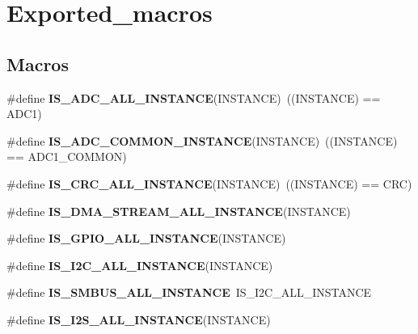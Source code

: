 \hypertarget{group___exported__macros}{}\section{Exported\+\_\+macros}
\label{group___exported__macros}
\subsection*{Macros}
\begin{DoxyCompactItemize}
\item 
\mbox{\label{group___exported__macros_ga2204b62b378bcf08b3b9006c184c7c23}} 
\#define {\bfseries I\+S\+\_\+\+A\+D\+C\+\_\+\+A\+L\+L\+\_\+\+I\+N\+S\+T\+A\+N\+CE}(I\+N\+S\+T\+A\+N\+CE)~((I\+N\+S\+T\+A\+N\+CE) == A\+D\+C1)
\item 
\mbox{\label{group___exported__macros_gad8a5831c786b6b265531b890a194cbe2}} 
\#define {\bfseries I\+S\+\_\+\+A\+D\+C\+\_\+\+C\+O\+M\+M\+O\+N\+\_\+\+I\+N\+S\+T\+A\+N\+CE}(I\+N\+S\+T\+A\+N\+CE)~((I\+N\+S\+T\+A\+N\+CE) == A\+D\+C1\+\_\+\+C\+O\+M\+M\+ON)
\item 
\mbox{\label{group___exported__macros_gaa514941a7f02f65eb27450c05e4e8dd1}} 
\#define {\bfseries I\+S\+\_\+\+C\+R\+C\+\_\+\+A\+L\+L\+\_\+\+I\+N\+S\+T\+A\+N\+CE}(I\+N\+S\+T\+A\+N\+CE)~((I\+N\+S\+T\+A\+N\+CE) == C\+RC)
\item 
\#define {\bfseries I\+S\+\_\+\+D\+M\+A\+\_\+\+S\+T\+R\+E\+A\+M\+\_\+\+A\+L\+L\+\_\+\+I\+N\+S\+T\+A\+N\+CE}(I\+N\+S\+T\+A\+N\+CE)
\item 
\#define {\bfseries I\+S\+\_\+\+G\+P\+I\+O\+\_\+\+A\+L\+L\+\_\+\+I\+N\+S\+T\+A\+N\+CE}(I\+N\+S\+T\+A\+N\+CE)
\item 
\#define {\bfseries I\+S\+\_\+\+I2\+C\+\_\+\+A\+L\+L\+\_\+\+I\+N\+S\+T\+A\+N\+CE}(I\+N\+S\+T\+A\+N\+CE)
\item 
\mbox{\label{group___exported__macros_ga85b79d63f4643c0de9a7519290a0eceb}} 
\#define {\bfseries I\+S\+\_\+\+S\+M\+B\+U\+S\+\_\+\+A\+L\+L\+\_\+\+I\+N\+S\+T\+A\+N\+CE}~I\+S\+\_\+\+I2\+C\+\_\+\+A\+L\+L\+\_\+\+I\+N\+S\+T\+A\+N\+CE
\item 
\#define {\bfseries I\+S\+\_\+\+I2\+S\+\_\+\+A\+L\+L\+\_\+\+I\+N\+S\+T\+A\+N\+CE}(I\+N\+S\+T\+A\+N\+CE)
\item 

\end{DoxyCompactItemize}
